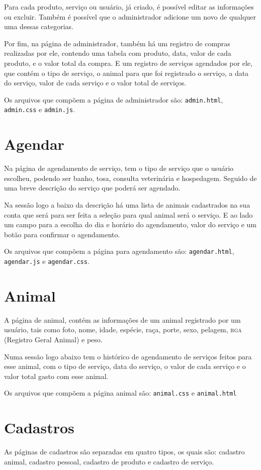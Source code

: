 Para cada produto, serviço ou usuário, já criado, é possível editar as informações
ou excluir. Também é possível que o administrador adicione um novo de qualquer uma
dessas categorias.

Por fim, na página de administrador, também há um registro de compras realizadas por
ele, contendo uma tabela com produto, data, valor de cada produto, e o valor total da
compra. E um registro de serviços agendados por ele, que contém o tipo de serviço, o
animal para que foi registrado o serviço, a data do serviço, valor de cada serviço e o
valor total de serviços.

Os arquivos que compõem a página de administrador são: \texttt{admin.html},
\texttt{admin.css} e \texttt{admin.js}.

\section{Agendar}
Na página de agendamento de serviço, tem o tipo de serviço que o usuário escolheu,
podendo ser banho, tosa, consulta veterinária e hospedagem. Seguido de uma breve descrição
do serviço que poderá ser agendado.

Na sessão logo a baixo da descrição há uma lista de animais cadastrados na sua conta
que será para ser feita a seleção para qual animal será o serviço. E ao lado um campo
para a escolha do dia e horário do agendamento, valor do serviço e um botão para confirmar
o agendamento.

Os arquivos que compõem a página para agendamento são: \texttt{agendar.html},\\
\texttt{agendar.js} e \texttt{agendar.css}.

\section{Animal}
A página de animal, contém as informações de um animal registrado por um usuário, tais como
foto, nome, idade, espécie, raça, porte, sexo, pelagem, \textsc{rga} (Registro Geral Animal)
e peso.

Numa sessão logo abaixo tem o histórico de agendamento de serviços feitos para esse animal,
com o tipo de serviço, data do serviço, o valor de cada serviço e o valor total gasto com
esse animal.

Os arquivos que compõem a página animal são: \texttt{animal.css} e \texttt{animal.html}

\section{Cadastros}
As páginas de cadastros são separadas em quatro tipos, os quais são: cadastro animal,
cadastro pessoal, cadastro de produto e cadastro de serviço.

